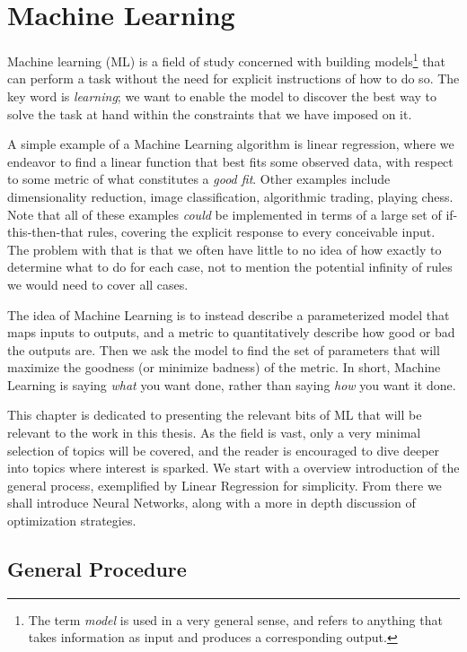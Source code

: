 \documentclass[Thesis.tex]{subfiles}
\begin{document}
\chapter{Machine Learning}
\label{chp:machine-learning}

Machine learning (ML) is a field of study concerned with building
models\footnote{The term \emph{model} is used in a very general sense, and
refers to anything that takes information as input and produces a corresponding
output.} that can perform a task without the need for explicit instructions of
how to do so. The key word is \emph{learning}; we want to enable the model to
discover the best way to solve the task at hand within the constraints that we
have imposed on it.

A simple example of a Machine Learning algorithm is linear regression, where we endeavor to
find a linear function that best fits some observed data, with respect to some
metric of what constitutes a \emph{good fit}. Other examples include
dimensionality reduction, image classification, algorithmic trading, playing
chess. Note that all of these examples \emph{could} be implemented in terms of a
large set of if-this-then-that rules, covering the explicit response to every
conceivable input. The problem with that is that we often have little to no idea
of how exactly to determine what to do for each case, not to mention the
potential infinity of rules we would need to cover all cases.

The idea of Machine Learning is to instead describe a parameterized model that
maps inputs to outputs, and a metric to quantitatively describe how good or bad
the outputs are. Then we ask the model to find the set of parameters that will
maximize the goodness (or minimize badness) of the metric. In short, Machine
Learning is saying \emph{what} you want done, rather than saying \emph{how} you
want it done.

This chapter is dedicated to presenting the relevant bits of ML that will be
relevant to the work in this thesis. As the field is vast, only a very minimal
selection of topics will be covered, and the reader is encouraged to dive deeper
into topics where interest is sparked. We start with a overview introduction of
the general process, exemplified by Linear Regression for simplicity. From there
we shall introduce Neural Networks, along with a more in depth discussion of
optimization strategies.



\section{General Procedure}
\end{document}
